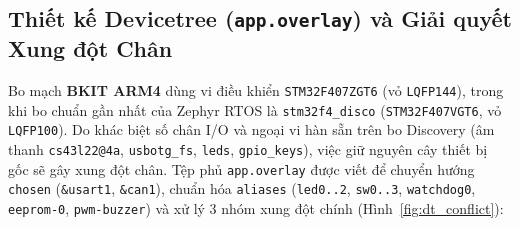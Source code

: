 \subsection{Thiết kế Devicetree (\texttt{app.overlay}) và Giải quyết Xung đột Chân}
Bo mạch \textbf{BKIT ARM4} dùng vi điều khiển \texttt{STM32F407ZGT6} (vỏ \texttt{LQFP144}), trong khi bo chuẩn gần nhất của Zephyr RTOS là \texttt{stm32f4\_disco} (\texttt{STM32F407VGT6}, vỏ \texttt{LQFP100}). Do khác biệt số chân I/O và ngoại vi hàn sẵn trên bo Discovery (âm thanh \texttt{cs43l22@4a}, \texttt{usbotg\_fs}, \texttt{leds}, \texttt{gpio\_keys}), việc giữ nguyên cây thiết bị gốc sẽ gây xung đột chân. Tệp phủ \texttt{app.overlay} được viết để chuyển hướng \texttt{chosen} (\texttt{\&usart1}, \texttt{\&can1}), chuẩn hóa \texttt{aliases} (\texttt{led0..2}, \texttt{sw0..3}, \texttt{watchdog0}, \texttt{eeprom-0}, \texttt{pwm-buzzer}) và xử lý 3 nhóm xung đột chính (Hình~\ref{fig:dt_conflict}):

